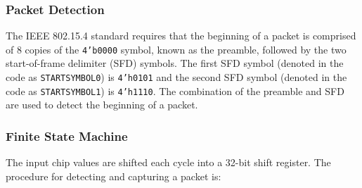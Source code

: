 \subsubsection{Packet Detection}
The IEEE 802.15.4 standard \cite{15-4-standard} requires that the beginning of a packet is comprised of 8 copies of the \texttt{4'b0000} symbol, known as the preamble, followed by the two start-of-frame delimiter (SFD) symbols. The first SFD symbol (denoted in the code as \texttt{STARTSYMBOL0}) is \texttt{4'h0101} and the second SFD symbol (denoted in the code as \texttt{STARTSYMBOL1}) is \texttt{4'h1110}. The combination of the preamble and SFD are used to detect the beginning of a packet.

\subsubsection{Finite State Machine}
The input chip values are shifted each cycle into a 32-bit shift register. The procedure for detecting and capturing a packet is:

